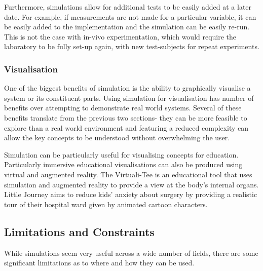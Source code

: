 \documentclass{UoYCSproject}
\begin{document}
Furthermore, simulations allow for additional tests to be easily added at a later date.
For example, if measurements are not made for a particular variable, it can be easily added to the implementation and the simulation can be easily re-run.
This is not the case with in-vivo experimentation, which would require the laboratory to be fully set-up again, with new test-subjects for repeat experiments.


\subsubsection{Visualisation}
One of the biggest benefits of simulation is the ability to graphically visualise a system or its constituent parts.
Using simulation for visualisation has number of benefits over attempting to demonstrate real world systems.
Several of these benefits translate from the previous two sections- they can be more feasible to explore than a real world environment and featuring a reduced complexity can allow the key concepts to be understood without overwhelming the user.

Simulation can be particularly useful for visualising concepts for education. 
Particularly immersive educational visualisations can also be produced using virtual and augmented reality.
The Virtuali-Tee is an educational tool that uses simulation and augmented reality to provide a view at the body's internal organs\cite{curiscope}.
Little Journey aims to reduce kids' anxiety about surgery by providing a realistic tour of their hospital ward given by animated cartoon characters\cite{little_journey}.



\subsection{Limitations and Constraints}
While simulations seem very useful across a wide number of fields, there are some significant limitations as to where and how they can be used.
\end{document}
